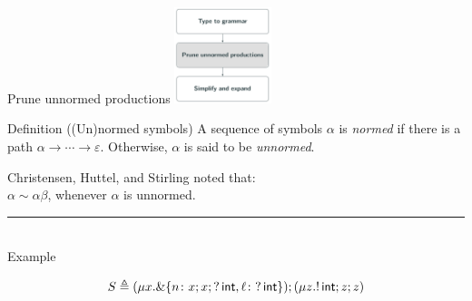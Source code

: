 \documentclass[10pt]{beamer}
\begin{document}
\begin{frame} {Prune unnormed productions}
	\hfill\includegraphics[height=2.8cm]{img/prune.png}

	\vspace*{-2.8cm}
	\begin{varblock}[7.8cm]{Definition ((Un)normed symbols)}
			\smallskip 
		A sequence of symbols $\alpha$ is \emph{normed} if there is a path $\alpha \rightarrow \cdots \rightarrow \varepsilon$. 
		Otherwise, $\alpha$ is said to be \emph{unnormed}.\\
	\end{varblock}

	Christensen, Huttel, and Stirling noted that:\\\smallskip
	\hspace*{1cm}	$\alpha \sim \alpha \beta$, whenever $\alpha$ is unnormed.

	\pause
	\vspace*{-1mm}
	{\color{teal}\rule{3cm}{2pt}}\\
   	{\color{teal} Example} \\\smallskip
	\vspace*{-7mm}

	$$S \triangleq (\mu x. \&\{n\colon x;x;?\,\mathsf{int},
      \ell\colon ?\,\mathsf{int} \});( \mu z. !\,\mathsf{int}; z;z )$$


\end{frame}
\end{document}
